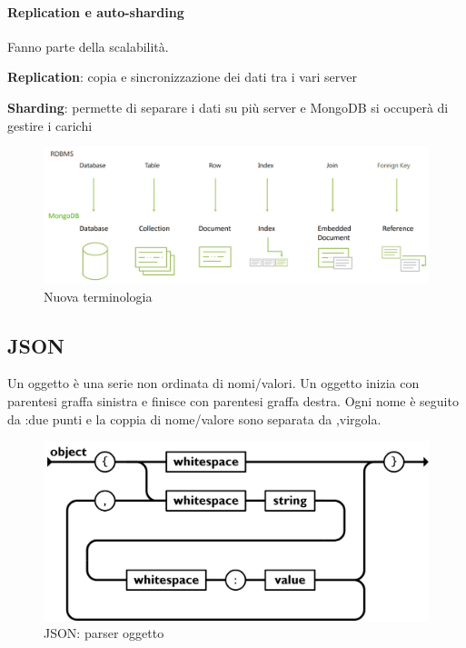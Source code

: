\documentclass[11pt,a4paper]{book}
\begin{document}
\paragraph{Replication e auto-sharding}
Fanno parte della scalabilità.

\textbf{Replication}: copia e sincronizzazione dei dati tra i vari server

\textbf{Sharding}: permette di separare i dati su più server e MongoDB si occuperà di gestire i carichi

\begin{figure}[h!]
	\begin{center}
		\includegraphics[scale=0.6]{img/009.png}
		\caption{Nuova terminologia}
		\label{fig: 009}
	\end{center}
\end{figure}
 


\subsection{JSON}
Un oggetto è una serie non ordinata di nomi/valori. Un oggetto inizia con {parentesi graffa sinistra e finisce con }parentesi graffa destra. Ogni nome è seguito da :due punti e la coppia di nome/valore sono separata da ,virgola.
\begin{figure}[h!]
	\begin{center}
		\includegraphics[scale=0.6]{img/002.png}
		\caption{JSON: parser oggetto}
		\label{fig: 002}
	\end{center}
\end{figure}
\end{document}

